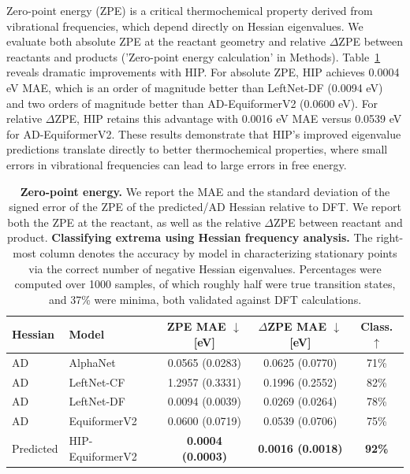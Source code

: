 \documentclass[pdflatex,sn-mathphys-num]{sn-jnl}%
\theoremstyle{thmstyleone}%
\theoremstyle{thmstyletwo}%
\theoremstyle{thmstylethree}%
\begin{document}
Zero-point energy (ZPE) is a critical thermochemical property derived from vibrational frequencies, which depend directly on Hessian eigenvalues. We evaluate both absolute ZPE at the reactant geometry and relative $\Delta$ZPE between reactants and products ('Zero-point energy calculation' in Methods).
Table~\ref{tab:zpe} reveals dramatic improvements with HIP. For absolute ZPE, HIP achieves 0.0004 eV MAE, which is an order of magnitude better than LeftNet-DF (0.0094 eV) and two orders of magnitude better than AD-EquiformerV2 (0.0600 eV). For relative $\Delta$ZPE, HIP retains this advantage with 0.0016 eV MAE versus 0.0539 eV for AD-EquiformerV2.
These results demonstrate that HIP's improved eigenvalue predictions translate directly to better thermochemical properties, where small errors in vibrational frequencies can lead to large errors in free energy.

\begin{table}
\begin{tabular}{llccc}
\hline
Hessian & Model & ZPE MAE $\downarrow$ [eV] & $\Delta$ZPE MAE $\downarrow$ [eV] & Class. $\uparrow$ \\
\hline
AD & AlphaNet & 0.0565 (0.0283) & 0.0625 (0.0770) & 71\% \\
AD & LeftNet-CF & 1.2957 (0.3331) & 0.1996 (0.2552) & 82\% \\
AD & LeftNet-DF & 0.0094 (0.0039) & 0.0269 (0.0264)  & 78\% \\
AD & EquiformerV2 & 0.0600 (0.0719) & 0.0539 (0.0706) & 75\% \\
Predicted & HIP-EquiformerV2 & \textbf{0.0004 (0.0003)} & \textbf{0.0016 (0.0018)} & \textbf{92\%} \\
\hline
\end{tabular}
\caption{
\textbf{Zero-point energy.} 
We report the MAE and the standard deviation of the signed error of the ZPE of the predicted/AD Hessian relative to DFT. We report both the ZPE at the reactant, as well as the relative $\Delta$ZPE between reactant and product.
\textbf{Classifying extrema using Hessian frequency analysis.}
The right-most column denotes the accuracy by model in characterizing stationary points via the correct number of negative Hessian eigenvalues. 
Percentages were computed over 1000 samples, of which roughly half were true transition states, and 37\% were minima, both validated against DFT calculations.
}
\label{tab:zpe}
\end{table}
\end{document}
